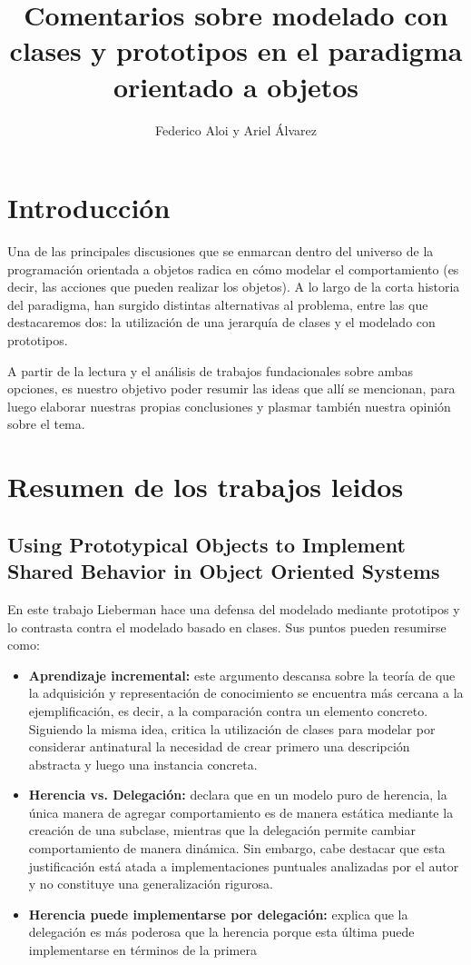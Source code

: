 \documentclass[a4paper,10pt]{article}
\title{Comentarios sobre modelado con clases y prototipos en el paradigma orientado a objetos}
\author{Federico Aloi y Ariel Álvarez}
\newcommand{\strongitem}[1]{\item \textbf{#1:}}
\begin{document}
\maketitle

\section{Introducción}
Una de las principales discusiones que se enmarcan dentro del universo de la programación orientada a objetos radica en cómo modelar el comportamiento (es decir, las acciones que pueden realizar los objetos). A lo largo de la corta historia del paradigma, han surgido distintas alternativas al problema, entre las que destacaremos dos: la utilización de una jerarquía de clases y el modelado con prototipos.

A partir de la lectura y el análisis de trabajos fundacionales sobre ambas opciones, es nuestro objetivo poder resumir las ideas que allí se mencionan, para luego elaborar nuestras propias conclusiones y plasmar también nuestra opinión sobre el tema.

\section{Resumen de los trabajos leidos}

\subsection{Using Prototypical Objects to Implement Shared Behavior in Object Oriented Systems}

En este trabajo Lieberman hace una defensa del modelado mediante prototipos y lo contrasta contra el modelado basado en clases. Sus puntos pueden resumirse como:

\begin{itemize}
	\strongitem{Aprendizaje incremental} este argumento descansa sobre la teoría de que la adquisición y representación de conocimiento se encuentra más cercana a la ejemplificación, es decir, a la comparación contra un elemento concreto. Siguiendo la misma idea, critica la utilización de clases para modelar por considerar antinatural la necesidad de crear primero una descripción abstracta y luego una instancia concreta. 
	\strongitem{Herencia vs. Delegación} declara que en un modelo puro de herencia, la única manera de agregar comportamiento es de manera estática mediante la creación de una subclase, mientras que la delegación permite cambiar comportamiento de manera dinámica. Sin embargo, cabe destacar que esta justificación está atada a implementaciones puntuales analizadas por el autor y no constituye una generalización rigurosa.
	\strongitem{Herencia puede implementarse por delegación} explica que la delegación es más poderosa que la herencia porque esta última puede implementarse en términos de la primera
\end{itemize}
\end{document}
